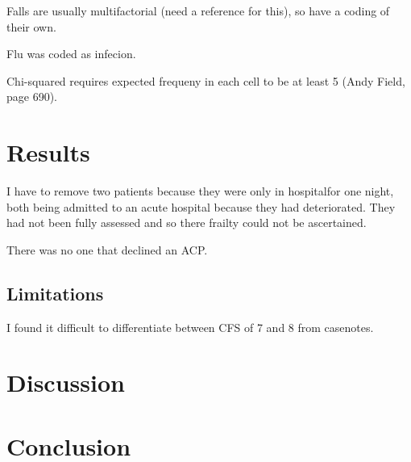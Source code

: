 \documentclass
[
	12pt,
	a4paper,
	oneside,
]{report}
\begin{document}
Falls are usually multifactorial (need a reference for this), so have a coding 
of their own.

Flu was coded as infecion.

Chi-squared requires expected frequeny in each cell to be at least 5 (Andy Field,
page 690).

\chapter{Results}
I have to remove two patients because they were only in hospitalfor one night,
both being admitted to an acute hospital because they had deteriorated. They
had not been fully assessed and so there frailty could not be ascertained.

There was no one that declined an ACP.

\section{Limitations}
I found it difficult to differentiate between CFS of 7 and 8 from casenotes.

\chapter{Discussion}

\chapter{Conclusion}

\clearpage
\printbibliography
\end{document}
